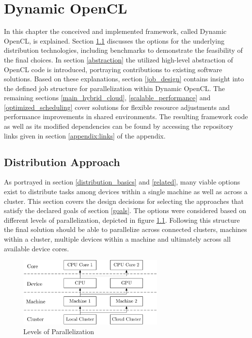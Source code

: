 \chapter{Dynamic OpenCL}
\label{main}
In this chapter the conceived and implemented framework, called Dynamic OpenCL, is explained. Section \ref{distribution} discusses the options for the underlying distribution technologies, including benchmarks to demonstrate the feasibility of the final choices. In section \ref{abstraction} the utilized high-level abstraction of OpenCL code is introduced, portraying contributions to existing software solutions. Based on these explanations, section \ref{job_design} contains insight into the defined job structure for parallelization within Dynamic OpenCL. The remaining sections \ref{main_hybrid_cloud}, \ref{scalable_performance} and \ref{optimized_scheduling} cover solutions for flexible resource adjustments and performance improvements in shared environments. The resulting framework code as well as its modified dependencies can be found by accessing the repository links given in section \ref{appendix:links} of the appendix.

\section{Distribution Approach}
\label{distribution}
As portrayed in section \ref{distribution_basics} and \ref{related}, many viable options exist to distribute tasks among devices within a single machine as well as across a cluster. This section covers the design decisions for selecting the approaches that satisfy the declared goals of section \ref{goals}. The options were considered based on different levels of parallelization, depicted in figure \ref{img:parallelization_levels}. Following this structure the final solution should be able to parallelize across connected clusters, machines within a cluster, multiple devices within a machine and ultimately across all available device cores.

\begin{figure}[H]
	\includegraphics[width=0.65\textwidth]{drawings/parallelization_struct.pdf}
	\centering
	\caption{Levels of Parallelization}
	\label{img:parallelization_levels}
\end{figure}

